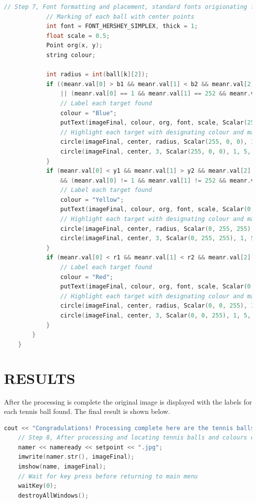 \documentclass[a4paper, 10pt]{article}
\begin{document}
\begin{lstlisting}[language = C++]
			// Step 7, Font formatting and placement, standard fonts origionating from center point of each ball
			// Marking of each ball with center points
			int font = FONT_HERSHEY_SIMPLEX, thick = 1;
			float scale = 0.5;
			Point org(x, y);
			string colour;

			int radius = int(ball[k][2]);
			if ((meanr.val[0] > b1 && meanr.val[1] < b2 && meanr.val[2] < b3)
				|| (meanr.val[0] == 1 && meanr.val[1] == 252 && meanr.val[2] == 251)) {
				// Label each target found
				colour = "Blue";
				putText(imageFinal, colour, org, font, scale, Scalar(255, 0, 0), thick, 5);
				// Highlight each target with designating colour and mark the center points
				circle(imageFinal, center, radius, Scalar(255, 0, 0), 1, 5, 0);
				circle(imageFinal, center, 3, Scalar(255, 0, 0), 1, 5, 0);
			}
			if (meanr.val[0] < y1 && meanr.val[1] > y2 && meanr.val[2] > y3
				&& (meanr.val[0] != 1 && meanr.val[1] != 252 && meanr.val[2] != 251)) {
				// Label each target found
				colour = "Yellow";
				putText(imageFinal, colour, org, font, scale, Scalar(0, 255, 255), thick, 5);
				// Highlight each target with designating colour and mark the center points
				circle(imageFinal, center, radius, Scalar(0, 255, 255), 1, 5, 0);
				circle(imageFinal, center, 3, Scalar(0, 255, 255), 1, 5, 0);
			}			
			if (meanr.val[0] < r1 && meanr.val[1] < r2 && meanr.val[2] > r3) {
				// Label each target found
				colour = "Red";
				putText(imageFinal, colour, org, font, scale, Scalar(0, 0, 255), thick, 5);
				// Highlight each target with designating colour and mark the center points
				circle(imageFinal, center, radius, Scalar(0, 0, 255), 1, 5, 0);
				circle(imageFinal, center, 3, Scalar(0, 0, 255), 1, 5, 0);
			}
		}
	}

\end{lstlisting}


\clearpage

\section{RESULTS}

After the processing is complete the original image is displayed with the labels for each tennis ball found. The final result is shown below.

\begin{lstlisting}[language = C++]
	cout << "Congradulations! Processing complete here are the tennis balls found with their respected colours!\n\npress any key to go back to main menu, or hit esc twice to quit\n\n-------------------------------------------------------------------------\n" << endl;
	// Step 8, After processing and locating tennis balls and colours complete, display final results, and save for reference
	namer << nameready << setpoint << ".jpg";
	imwrite(namer.str(), imageFinal);
	imshow(name, imageFinal); 
	// Wait for key press before returning to main menu
	waitKey(0);
	destroyAllWindows();
\end{lstlisting}
\end{document}
